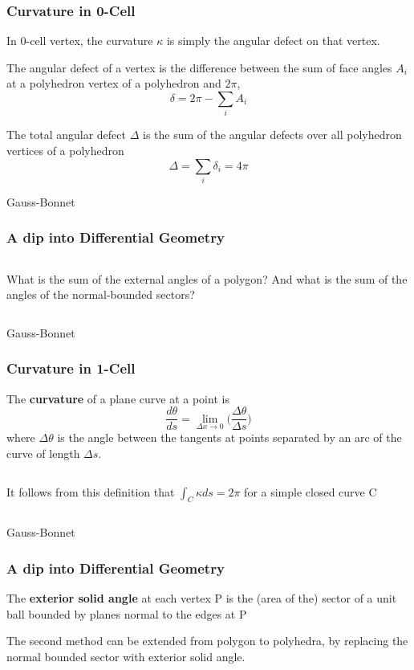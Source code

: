 \documentclass{beamer}
\begin{document}
\begin{frame}
	\frametitle{Curvature in 0-Cell}
	In 0-cell vertex, the curvature $\kappa$ is simply the angular defect on that vertex.
	\begin{definition}
		The angular defect of a vertex is the difference between the sum of face angles $A_i$ at a polyhedron vertex of a polyhedron and $2 \pi$,
		\[
			\delta = 2 \pi - \sum_i A_i
		\]
	\end{definition}
	\begin{theorem}
		The total angular defect $\Delta$ is the sum of the angular defects over all polyhedron vertices of a polyhedron
		\[
			\Delta = \sum_i \delta_i = 4 \pi
		\]
	\end{theorem}
\end{frame}

\begin{frame}{Gauss-Bonnet}
    \frametitle{A dip into Differential Geometry}
    \begin{columns}
    		What is the sum of the external angles of a polygon?
    		\pause
    		And what is the sum of the angles of the normal-bounded sectors?
    \end{columns}
\end{frame}

\begin{frame}{Gauss-Bonnet}
    \frametitle{Curvature in 1-Cell}
    \begin{definition}[Curvature]
    	The \textbf{curvature} of a plane curve at a point is
    	\[
    		\frac{d\theta}{ds} = \lim_{\Delta x \to 0} \Big( \frac{\Delta \theta}{\Delta s} \Big)
    	\]
    	where $\Delta \theta$ is the angle between the tangents at points separated by an arc of the curve of length $\Delta s$.
    \end{definition}
    \vspace{\baselineskip}
    \begin{columns}
    	\pause
		\pause
			It follows from this definition that $\int_C \kappa ds = 2 \pi$ for a simple closed curve C
    \end{columns}
\end{frame}

\begin{frame}{Gauss-Bonnet}
    \frametitle{A dip into Differential Geometry}
    \begin{definition}
    	The \textbf{exterior solid angle} at each vertex P is the (area of the) sector of a unit ball bounded by planes normal to the edges at P
    \end{definition}
    \pause
    The second method can be extended from polygon to polyhedra, by replacing the normal bounded sector with exterior solid angle.
    \pause
\end{frame}
\end{document}
